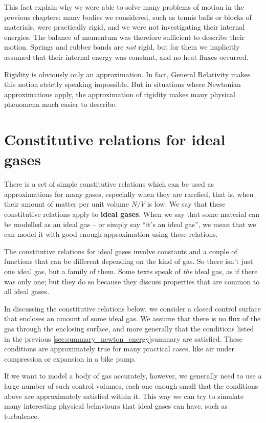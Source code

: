 \documentclass[a4paper,12pt,%
onecolumn,oneside,%
british%
]{memoir}
\renewcommand*{\|}[1][]{\nonscript\:#1\vert\nonscript\:\mathopen{}}
\newcommand*{\yN}{N}
\begin{document}
This fact explain why we were able to solve many problems of motion in the previous chapters: many bodies we considered, such as tennis balls or blocks of materials, were practically rigid, and we were not investigating their internal energies. The balance of momentum was therefore sufficient to describe their motion. Springs and rubber bands are \emph{not} rigid, but for them we implicitly assumed that their internal energy was constant, and no heat fluxes occurred.

\medskip

Rigidity is obviously only an approximation. In fact, General Relativity makes this notion strictly speaking impossible. But in situations where Newtonian approximations apply, the approximation of rigidity makes many physical phenomena much easier to describe.

\section{Constitutive relations for ideal gases}
\label{sec:int_energy_idealgas}

There is a set of simple constitutive relations which can be used as approximations for many gases, especially when they are rarefied, that is, when their amount of matter per unit volume $\yN/V$ is low. We say that these constitutive relations apply to \textbf{ideal gases}. When we say that some material can be modelled as an ideal gas -- or simply say \enquote{it's an ideal gas}, we mean that we can model it with good enough approximation using these relations.

The constitutive relations for ideal gases involve constants and a couple of functions that can be different depending on the kind of gas. So there isn't just one ideal gas, but a family of them. Some texts speak of \emph{the} ideal gas, as if there was only one; but they do so because they discuss properties that are common to all ideal gases.

\medskip

In discussing the constitutive relations below, we consider a closed control surface that encloses an amount of some ideal gas. We assume that there is no flux of the gas through the enclosing surface, and more generally that the conditions listed in the previous \ref{sec:summary_newton_energy}{summary} are satisfied. These conditions are approximately true for many practical cases, like air under compression or expansion in a bike pump.

If we want to model a body of gas accurately, however, we generally need to use a large number of such control volumes, each one enough small that the conditions above are approximately satisfied within it. This way we can try to simulate many interesting physical behaviours that ideal gases can have, such as turbulence.
\end{document}

